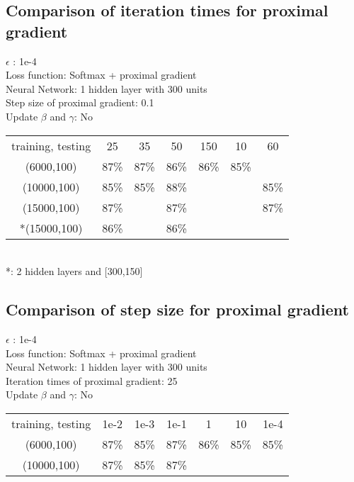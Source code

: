 \documentclass{article}
\begin{document}
\subsection{Comparison of iteration times for proximal gradient}
\begin{center}
$\epsilon$ : 1e-4\\
Loss function: Softmax + proximal gradient\\
Neural Network: 1 hidden layer with 300 units\\
Step size of proximal gradient: 0.1 \\
Update $\beta$ and $\gamma$:  No\\
	\begin{tabular}{c c c c c c c}
	\hline
		{training, testing} & 25 & 35 & 50 & 150 & 10 & 60\\
		(6000,100) & 87\% & 87\% & 86\% & 86\% & 85\% &\\
		(10000,100) & 85\% & 85\% & 88\% & & & 85\% \\
		(15000,100) & 87\% & & 87\% & & & 87\% \\
	    *(15000,100) & 86\% & & 86\% & & & \\
	\hline
	\end{tabular}\\
	*: 2 hidden layers and [300,150]
\end{center}

\subsection{Comparison of step size for proximal gradient}
\begin{center}
$\epsilon$ : 1e-4\\
Loss function: Softmax + proximal gradient\\
Neural Network: 1 hidden layer with 300 units\\
Iteration times of proximal gradient: 25 \\
Update $\beta$ and $\gamma$:  No\\
	\begin{tabular}{c c c c c c c}
	\hline
		{training, testing} & 1e-2 & 1e-3 & 1e-1 & 1 & 10 & 1e-4\\
		(6000,100) & 87\% & 85\% & 87\% & 86\% & 85\% & 85\%\\
		(10000,100) & 87\% & 85\% & 87\% & & & \\
	\hline
	\end{tabular}\\	
\end{center}
\end{document}
